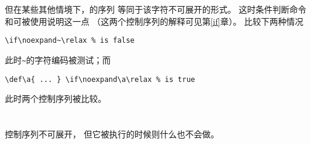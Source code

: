 \documentclass{book}
\begin{document}
但在某些其他情境下，的序列
等同于该字符不可展开的形式。
这时条件判断命令和可被使用说明这一点
（这两个控制序列的解释可见第\ref{if}章）。
比较下两种情况
\begin{verbatim}
\if\noexpand~\relax % is false
\end{verbatim}
此时\texttt{\~}的字符编码被测试；而
\begin{verbatim}
\def\a{ ... } \if\noexpand\a\relax % is true
\end{verbatim}
此时两个控制序列被比较。

\section{\protect{}}

控制序列不可展开，
但它被执行的时候则什么也不会做。
\end{document}
